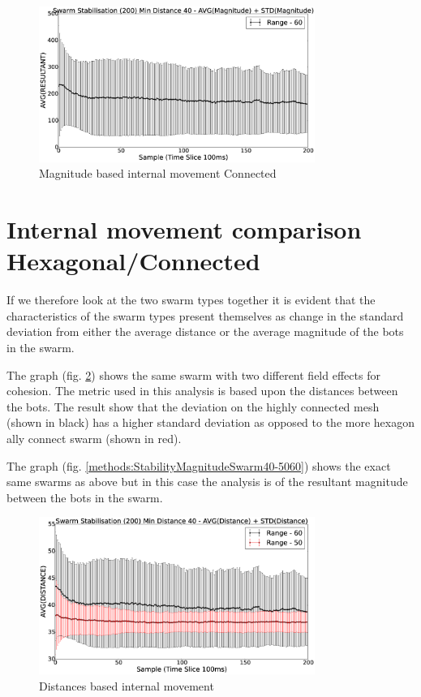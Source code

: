 \documentclass[10pt,journal,letterpaper,twoside]{IEEEtran}
\newcommand{\swarmA}{Hexagonal}
\newcommand{\swarmB}{Connected}
\newcommand{\stability}{internal movement}
\newcommand{\Stability}{Internal movement}
\newcommand{\Fig}{fig.}
\begin{document}
\begin{figure}[H]
\begin{center}
\includegraphics[width=9cm]{figures/StabilityMagnitudeSwarm40-60}
\end{center}
\caption{Magnitude based \stability{} \swarmB{}\label{methods:StabilityMagnitudeSwarm40-60}}
\end{figure}

\section{\Stability{} comparison \swarmA{}/\swarmB{}\label{section:stabilityComparison}}

If we therefore look at the two swarm types together it is evident
that the characteristics of the swarm types present themselves as
change in the standard deviation from either the average distance or
the average magnitude of the bots in the swarm.

The graph (\Fig{} \ref{methods:StabilityDistanceSwarm40-5060}) shows
the same swarm with two different field effects for cohesion. The
metric used in this analysis is based upon the distances between the
bots. The result show that the deviation on the highly connected mesh
(shown in black) has a higher standard deviation as opposed to the
more hexagon ally connect swarm (shown in red).

The graph (\Fig{} \ref{methods:StabilityMagnitudeSwarm40-5060}) shows
the exact same swarms as above but in this case the analysis is of the
resultant magnitude between the bots in the swarm.

\begin{figure}[H]
\begin{center}
\includegraphics[width=9cm]{figures/StabilityDistanceSwarm40-5060}
\end{center}
\caption{Distances based \stability{}\label{methods:StabilityDistanceSwarm40-5060}}
\end{figure}
\end{document}

